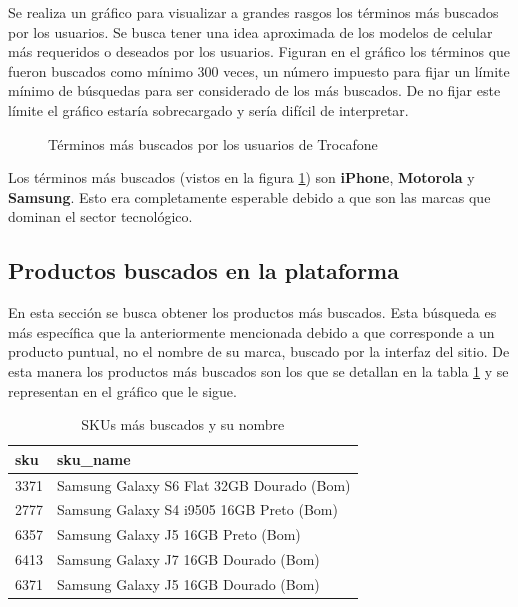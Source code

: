 \documentclass[a4paper]{article}
\begin{document}
Se realiza un gráfico para visualizar a grandes rasgos los términos más buscados por los usuarios. Se busca tener una idea aproximada de los modelos de celular más requeridos o deseados por los usuarios. Figuran en el gráfico los términos que fueron buscados como mínimo 300 veces, un número impuesto para fijar un límite mínimo de búsquedas para ser considerado de los más buscados. De no fijar este límite el gráfico estaría sobrecargado y sería difícil de interpretar.

\begin{figure}[h!]
	\caption{Términos más buscados por los usuarios de Trocafone}
	\label{fig:searchedterm}
\end{figure}

Los términos más buscados (vistos en la figura \ref{fig:searchedterm}) son \textbf{iPhone}, \textbf{Motorola} y \textbf{Samsung}. Esto era completamente esperable debido a que son las marcas que dominan el sector tecnológico.

\subsection{Productos buscados en la plataforma}

En esta sección se busca obtener los productos más buscados. Esta búsqueda es más específica que la anteriormente mencionada debido a que corresponde a un producto puntual, no el nombre de su marca, buscado por la interfaz del sitio. De esta manera los productos más buscados son los que se detallan en la tabla \ref{table:sencilla} y se representan en el gráfico que le sigue.

\begin{table}[h!]
	\begin{center}
		\begin{tabular}{|l|l|}
			\hline
			sku & sku\_name \\
			\hline \hline
			3371 & Samsung Galaxy S6 Flat 32GB Dourado (Bom) \\ \hline			
			2777 & Samsung Galaxy S4 i9505 16GB Preto (Bom) \\ \hline
			6357 & Samsung Galaxy J5 16GB Preto (Bom) \\ \hline
			6413 & Samsung Galaxy J7 16GB Dourado (Bom) \\ \hline
			6371 & Samsung Galaxy J5 16GB Dourado (Bom) \\ \hline
		\end{tabular}
		\caption{SKUs más buscados y su nombre}
		\label{table:sencilla}
	\end{center}
\end{table}
\end{document}
